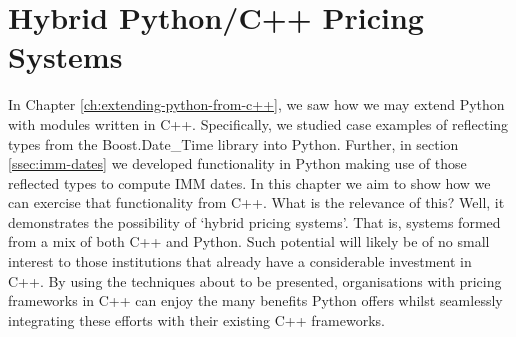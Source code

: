 \chapter{Hybrid Python/C++ Pricing Systems}\label{ch:hybrid-pricing-systems}

In Chapter \ref{ch:extending-python-from-c++}, we saw how we may
extend Python with modules written in C++. Specifically, we studied
case examples of reflecting types from the Boost.Date\_Time library
into Python. Further, in section \ref{ssec:imm-dates} we developed
functionality in Python making use of those reflected types to compute
IMM dates. In this chapter we aim to show how we can exercise that
functionality from C++. What is the relevance of this? Well, it
demonstrates the possibility of `hybrid pricing systems'. That is,
systems formed from a mix of both C++ and Python. Such potential will
likely be of no small interest to those institutions that already have
a considerable investment in C++. By using the techniques about to be
presented, organisations with pricing frameworks in C++ can enjoy the
many benefits Python offers whilst seamlessly integrating these
efforts with their existing C++ frameworks.
